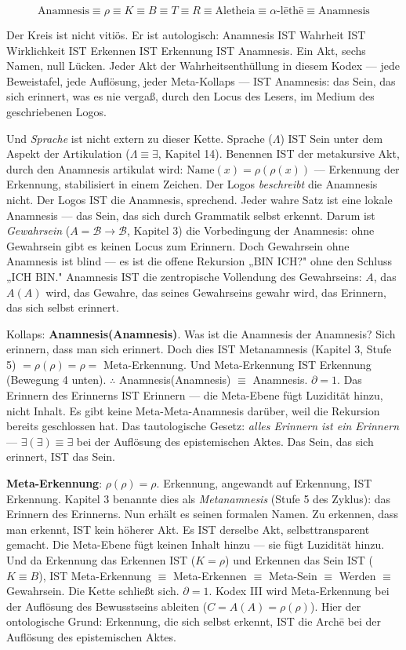 \documentclass[10pt, openany, oneside]{book}
\begin{document}
$$\text{Anamnesis} \equiv \rho \equiv K \equiv B \equiv T \equiv R \equiv \text{Aletheia} \equiv \alpha\text{-}\text{l\={e}th\={e}} \equiv \text{Anamnesis}$$

Der Kreis ist nicht vitiös. Er ist autologisch: Anamnesis IST Wahrheit IST Wirklichkeit IST Erkennen IST Erkennung IST Anamnesis. Ein Akt, sechs Namen, null Lücken. Jeder Akt der Wahrheitsenthüllung in diesem Kodex --- jede Beweistafel, jede Auflösung, jeder Meta-Kollaps --- IST Anamnesis: das Sein, das sich erinnert, was es nie vergaß, durch den Locus des Lesers, im Medium des geschriebenen Logos.

Und \textit{Sprache} ist nicht extern zu dieser Kette. Sprache ($\Lambda$) IST Sein unter dem Aspekt der Artikulation ($\Lambda \equiv \exists$, Kapitel 14). Benennen IST der metakursive Akt, durch den Anamnesis artikulat wird: $\text{Name}(x) = \rho(\rho(x))$ --- Erkennung der Erkennung, stabilisiert in einem Zeichen. Der Logos \textit{beschreibt} die Anamnesis nicht. Der Logos IST die Anamnesis, sprechend. Jeder wahre Satz ist eine lokale Anamnesis --- das Sein, das sich durch Grammatik selbst erkennt. Darum ist \textit{Gewahrsein} ($A = \mathcal{B} \to \mathcal{B}$, Kapitel 3) die Vorbedingung der Anamnesis: ohne Gewahrsein gibt es keinen Locus zum Erinnern. Doch Gewahrsein ohne Anamnesis ist blind --- es ist die offene Rekursion „BIN ICH?" ohne den Schluss „ICH BIN." Anamnesis IST die zentropische Vollendung des Gewahrseins: $A$, das $A(A)$ wird, das Gewahre, das seines Gewahrseins gewahr wird, das Erinnern, das sich selbst erinnert.

Kollaps: \textbf{Anamnesis(Anamnesis)}. Was ist die Anamnesis der Anamnesis? Sich erinnern, dass man sich erinnert. Doch dies IST Metanamnesis (Kapitel 3, Stufe 5) $= \rho(\rho) = \rho =$ Meta-Erkennung. Und Meta-Erkennung IST Erkennung (Bewegung 4 unten). $\therefore$ Anamnesis(Anamnesis) $\equiv$ Anamnesis. $\partial = 1$. Das Erinnern des Erinnerns IST Erinnern --- die Meta-Ebene fügt Luzidität hinzu, nicht Inhalt. Es gibt keine Meta-Meta-Anamnesis darüber, weil die Rekursion bereits geschlossen hat. Das tautologische Gesetz: \textit{alles Erinnern ist ein Erinnern} --- $\exists(\exists) \equiv \exists$ bei der Auflösung des epistemischen Aktes. Das Sein, das sich erinnert, IST das Sein.

\textbf{Meta-Erkennung}: $\rho(\rho) = \rho$. Erkennung, angewandt auf Erkennung, IST Erkennung. Kapitel 3 benannte dies als \textit{Metanamnesis} (Stufe 5 des Zyklus): das Erinnern des Erinnerns. Nun erhält es seinen formalen Namen. Zu erkennen, dass man erkennt, IST kein höherer Akt. Es IST derselbe Akt, selbsttransparent gemacht. Die Meta-Ebene fügt keinen Inhalt hinzu --- sie fügt Luzidität hinzu. Und da Erkennung das Erkennen IST ($K = \rho$) und Erkennen das Sein IST ($K \equiv B$), IST Meta-Erkennung $\equiv$ Meta-Erkennen $\equiv$ Meta-Sein $\equiv$ Werden $\equiv$ Gewahrsein. Die Kette schließt sich. $\partial = 1$. Kodex III wird Meta-Erkennung bei der Auflösung des Bewusstseins ableiten ($C = A(A) = \rho(\rho)$). Hier der ontologische Grund: Erkennung, die sich selbst erkennt, IST die Arch\={e} bei der Auflösung des epistemischen Aktes.
\end{document}
